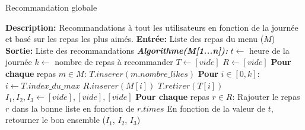 \documentclass[11pt]{article}
\begin{document}
\begin{algorithm}
    \caption{Recommandation globale}
    \begin{algorithmic}[1]
        \Statex \textbf{Description:} Recommandations à tout les utilisateurs en fonction de la journée et basé sur les repas les plus aimés.
        \Statex \textbf{Entrée:} Liste des repas du menu ($M$)
        \Statex \textbf{Sortie:} Liste des recommandations
        \State \textbf{\textit{Algorithme(M[1...n]):}}
        \State \hspace{0.5cm} $t \leftarrow$ heure de la journée
        \State \hspace{0.5cm} $k \leftarrow$ nombre de repas à recommander
        \State \hspace{0.5cm} $T \leftarrow [vide]$
        \State \hspace{0.5cm} $R \leftarrow [vide]$
        \State \hspace{0.5cm} \textbf{Pour chaque} repas $m \in M$:
        \State \hspace{1cm} $T.inserer(m.nombre\_likes)$
        \State \hspace{0.5cm} \textbf{Pour} $i \in [0, k]$:
        \State \hspace{1cm} $i \leftarrow T.index\_du\_max$
        \State \hspace{1cm} $R.inserer(M[i])$
        \State \hspace{1cm} $T.retirer(T[i])$
        \State \hspace{0.5cm} $I_1, I_2, I_3 \leftarrow [vide], [vide], [vide]$
        \State \hspace{0.5cm} \textbf{Pour chaque} repas $r \in R$:
        \State \hspace{1cm} Rajouter le repas $r$ dans la bonne liste en fonction de $r.times$
        \State \hspace{0.5cm} En fonction de la valeur de $t$, retourner le bon ensemble ($I_1$, $I_2$, $I_3$)
    \end{algorithmic}
\end{algorithm}
\end{document}
